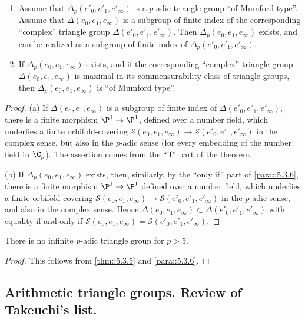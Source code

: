 \begin{cor}\label{cor::5.3.7}
 \begin{enumerate}
  \renewcommand{\theenumi}{\alph{enumi}}  
  \item Assume that $\Delta_p(e'_0,e'_1,e'_\infty)$ is a $p$-adic
	triangle group ``of Mumford type''. Assume that
	$\Delta(e_0,e_1,e_\infty)$ is a subgroup of finite index of the
	corresponding ``complex'' triangle group
	$\Delta(e'_0,e'_1,e'_\infty)$. Then $\Delta_p(e_0,e_1,e_\infty)$ 
	exists, and can be realized as a subgroup of finite index of
	$\Delta_p(e'_0,e'_1,e'_\infty)$.
  \item If $\Delta_p(e_0,e_1,e_\infty)$ exists, and if the
	corresponding ``complex'' triangle group $\Delta(e_0,e_1,e_\infty)$ is
	maximal in its commensurability class of triangle groups, then
	$\Delta_p(e_0,e_1,e_\infty)$ is ``of Mumford type''.
 \end{enumerate}
\end{cor}
\begin{proof}
 (a) If $\Delta(e_0,e_1,e_\infty)$ is a subgroup of finite index of
 $\Delta(e'_0,e'_1,e'_\infty)$, there is a finite morphism
 $\P^1\to \P^1$, defined over a number field, which underlies a
 finite orbifold-covering $\mathcal{S}(e_0,e_1,e_\infty)\to
 \mathcal{S}(e'_0,e'_1,e'_\infty)$ in the complex sense, but also
 in the $p$-adic sense (for every embedding of the number field
 in $\C_p$). The assertion comes from the ``if'' part of the
 theorem.

 (b) If $\Delta_p(e_0,e_1,e_\infty)$ exists, then, similarly, by the
 ``only if'' part of \ref{para::5.3.6}, there is a finite
 morphism $\P^1\to 
 \P^1$ defined over a number field, which underlies a finite
 orbifold-covering $\mathcal{S}(e_0,e_1,e_\infty)\to
 \mathcal{S}(e'_0,e'_1,e'_\infty)$ in the $p$-adic sense, and
 also in the complex sense. Hence
 $\Delta(e_0,e_1,e_\infty)\subset \Delta(e'_0,e'_1,e'_\infty)$
 with equality if and only if
 $\mathcal{S}(e_0,e_1,e_\infty)=\mathcal{S}(e'_0,e'_1,e'_\infty)$.
\end{proof}

\begin{cor}\label{cor::5.3.8} There is no infinite $p$-adic triangle
 group for $p>5$.
\end{cor}
\begin{proof}
 This follows from \ref{thm::5.3.5} and \ref{para::5.3.6}.  
\end{proof}


\subsection{Arithmetic triangle groups. Review of Takeuchi's
  list.}\label{sub::5.4}

